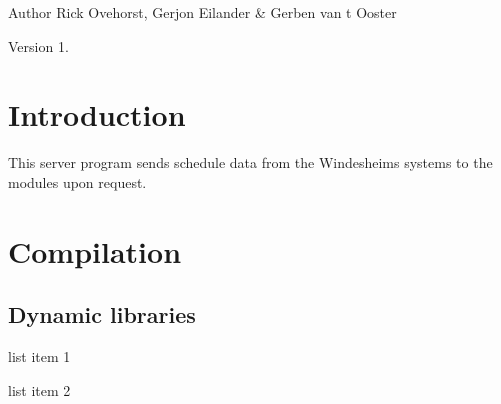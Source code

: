 \begin{DoxyAuthor}{Author}
Rick Ovehorst, Gerjon Eilander \& Gerben van \textquotesingle{}t Ooster 
\end{DoxyAuthor}
\begin{DoxyVersion}{Version}
1. 
\end{DoxyVersion}
\hypertarget{index_intro_sec}{}\section{Introduction}\label{index_intro_sec}
This server program sends schedule data from the Windesheim\textquotesingle{}s systems to the modules upon request.\hypertarget{index_compile_sec}{}\section{Compilation}\label{index_compile_sec}
\hypertarget{index_dl}{}\subsection{Dynamic libraries}\label{index_dl}

\begin{DoxyItemize}
\item list item 1
\item list item 2 
\end{DoxyItemize}